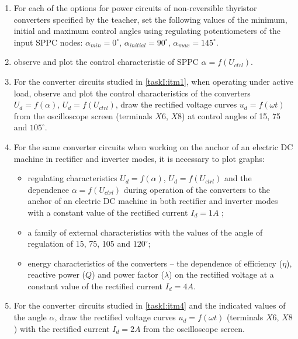 \documentclass[a4paper,14pt]{article}
\begin{document}
\begin{enumerate}[label=\emph{\arabic*}. , ref=\emph{\thesubsection.\arabic*}, leftmargin=0pt, labelindent=\parindent]
\item\label{taskI:itm1}For each of the options for power circuits of non-reversible thyristor converters specified by the teacher, set the following values of the minimum, initial and maximum control angles using regulating potentiometers of the input SPPC nodes:
$\alpha_{min} = 0^\circ$, $\alpha_{initial}= 90^\circ$, $\alpha_{max} = 145^\circ$.

\item\label{taskI:itm2} observe and plot the control characteristic of SPPC $\alpha = f(U_{ctrl})$.

\item\label{taskI:itm3}  For the converter circuits studied in \ref{taskI:itm1}, when operating under active load, observe and plot the control characteristics of the converters $U_d = f (\alpha)$, $U_d = f (U_{ctrl})$, 
draw the rectified voltage curves $u_d = f(\omega t)$ from the oscilloscope screen (terminals $X6$, $X8$) at control angles of 15, 75 and $105^\circ$.

\item\label{taskI:itm4} For the same converter circuits when working on the anchor of an electric DC machine in rectifier and inverter modes, it is necessary to plot graphs:

\begin{itemize}
\item regulating characteristics $U_d = f (\alpha)$, $U_d = f (U_{ctrl})$ and 
the dependence $\alpha = f (U_{ctrl})$ during operation of the converters to the anchor of an electric DC machine 
in both rectifier and inverter modes with a constant value of the rectified current $I_d = 1A$ ;

\item a family of external characteristics with the values of the angle of regulation of 15, 75, 105 and $120^\circ$;

\item energy characteristics of the converters -- the dependence of efficiency ($\eta$), 
reactive power ($Q$) and power factor ($\lambda$) on the rectified voltage at a constant value of the rectified current 
$I_d = 4A$.
\end{itemize}

\item\label{taskI:itm5} For the converter circuits studied in \ref{taskI:itm4} 
and the indicated values of the angle $\alpha$, draw the rectified voltage curves 
$u_d = f (\omega t)$ (terminals $X6$, $X8$) with the rectified current $I_d = 2A$ from the oscilloscope screen.
\end{enumerate}
\end{document}

